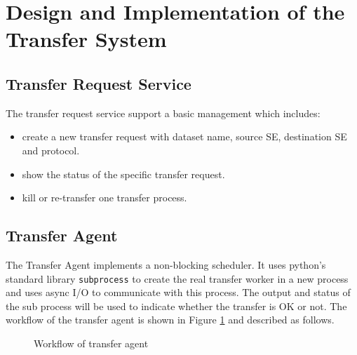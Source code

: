 \section{Design and Implementation of the Transfer System}

\subsection{Transfer Request Service}

The transfer request service support a basic management which includes:
\begin{itemize}
    \item create a new transfer request with dataset name,
          source SE, destination SE and protocol.
    \item show the status of the specific transfer request.
    \item kill or re-transfer one transfer process.
\end{itemize}
%
\subsection{Transfer Agent}
%
The Transfer Agent implements a non-blocking scheduler.
It uses python's standard library {\tt subprocess} to 
create the real transfer worker in a new process
and uses async I/O to communicate with this process.
The output and status of the sub process will be used 
to indicate whether the transfer is OK or not.
%
The workflow of the transfer agent is shown in Figure \ref{fig:agent}
and described as follows.
\begin{figure}[htbp]
    
    \caption{Workflow of transfer agent} \label{fig:agent}
\end{figure}

